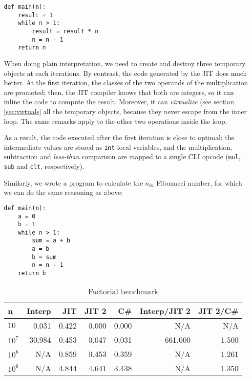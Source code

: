 \begin{lstlisting}
def main(n):
    result = 1
    while n > 1:
        result = result * n
        n = n - 1
    return n
\end{lstlisting}

When doing plain interpretation, we need to create and destroy three temporary
objects at each iterations.  By contrast, the code generated by the JIT does
much better.  At the first iteration, the classes of the two operands of the
multiplication are promoted; then, the JIT compiler knows that both are
integers, so it can inline the code to compute the result.  Moreover, it can
\emph{virtualize} (see section \ref{sec:virtuals} all the temporary objects, because they never escape from
the inner loop.  The same remarks apply to the other two operations inside
the loop.

As a result, the code executed after the first iteration is close to optimal:
the intermediate values are stored as \lstinline{int} local variables, and the
multiplication, subtraction and \emph{less-than} comparison are mapped to a
single CLI opcode (\lstinline{mul}, \lstinline{sub} and \lstinline{clt},
respectively).

Similarly, we wrote a program to calculate the $n_{th}$ Fibonacci number, for
which we can do the same reasoning as above:

\begin{lstlisting}
def main(n):
    a = 0
    b = 1
    while n > 1:
        sum = a + b
        a = b
        b = sum
        n = n - 1
    return b
\end{lstlisting}


\begin{table}[ht]
  \begin{tabular}{|l|r|r|r|r||r|r|}
    \hline
    \textbf{n} & 
    \textbf{Interp} &
    \textbf{JIT} &
    \textbf{JIT 2} &
    \textbf{C\#} &
    \textbf{Interp/JIT 2} &
    \textbf{JIT 2/C\#} \\
    \hline

    $10$    &   0.031  &  0.422  &  0.000  &  0.000  &      N/A  &    N/A \\
    $10^7$  &  30.984  &  0.453  &  0.047  &  0.031  &  661.000  &  1.500 \\
    $10^8$  &     N/A  &  0.859  &  0.453  &  0.359  &      N/A  &  1.261 \\
    $10^9$  &     N/A  &  4.844  &  4.641  &  3.438  &      N/A  &  1.350 \\

    \hline

  \end{tabular}
  \caption{Factorial benchmark}
  \label{tab:factorial}
\end{table}


